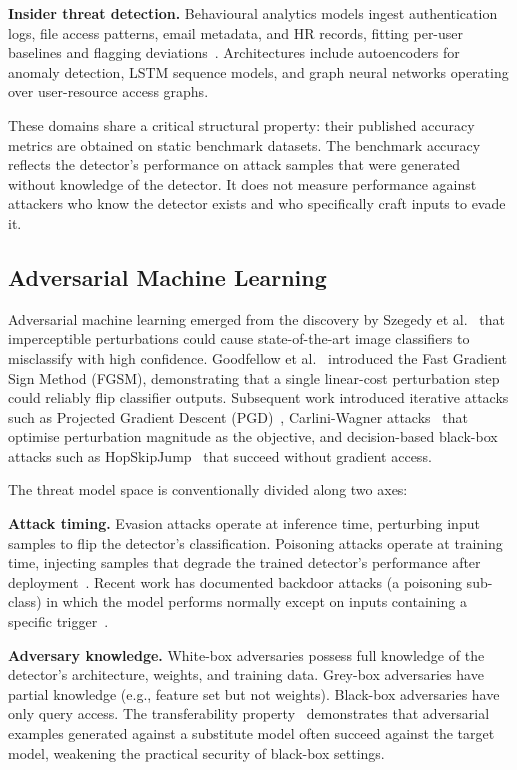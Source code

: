 \documentclass[sigconf,nonacm]{acmart}
\begin{document}
\textbf{Insider threat detection.} Behavioural analytics models ingest
authentication logs, file access patterns, email metadata, and HR records,
fitting per-user baselines and flagging deviations~\cite{cmu_cert,glasser2013}.
Architectures include autoencoders for anomaly detection, LSTM sequence
models, and graph neural networks operating over user-resource access graphs.

These domains share a critical structural property: their published accuracy
metrics are obtained on static benchmark datasets. The benchmark accuracy
reflects the detector's performance on attack samples that were generated
without knowledge of the detector. It does not measure performance against
attackers who know the detector exists and who specifically craft inputs to
evade it.

\subsection{Adversarial Machine Learning}

Adversarial machine learning emerged from the discovery by Szegedy et
al.~\cite{szegedy2014intriguing} that imperceptible perturbations could cause
state-of-the-art image classifiers to misclassify with high confidence.
Goodfellow et al.~\cite{goodfellow2015fgsm} introduced the Fast Gradient Sign
Method (FGSM), demonstrating that a single linear-cost perturbation step
could reliably flip classifier outputs. Subsequent work introduced iterative
attacks such as Projected Gradient Descent
(PGD)~\cite{madry2018pgd}, Carlini-Wagner attacks~\cite{carlini2017cw} that
optimise perturbation magnitude as the objective, and decision-based black-box
attacks such as HopSkipJump~\cite{chen2020hopskipjump} that succeed without
gradient access.

The threat model space is conventionally divided along two axes:

\textbf{Attack timing.} Evasion attacks operate at inference time, perturbing
input samples to flip the detector's classification. Poisoning attacks operate
at training time, injecting samples that degrade the trained detector's
performance after deployment~\cite{biggio2012poisoning}. Recent work has
documented backdoor attacks (a poisoning sub-class) in which the model
performs normally except on inputs containing a specific
trigger~\cite{gu2017badnets}.

\textbf{Adversary knowledge.} White-box adversaries possess full knowledge of
the detector's architecture, weights, and training data. Grey-box adversaries
have partial knowledge (e.g., feature set but not weights). Black-box
adversaries have only query access. The transferability
property~\cite{papernot2016transferability} demonstrates that adversarial
examples generated against a substitute model often succeed against the
target model, weakening the practical security of black-box settings.
\end{document}
